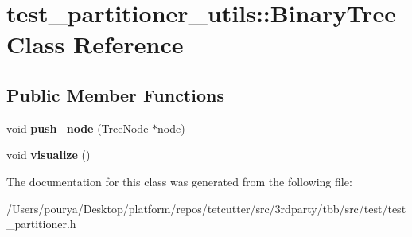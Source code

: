 \hypertarget{classtest__partitioner__utils_1_1BinaryTree}{}\section{test\+\_\+partitioner\+\_\+utils\+:\+:Binary\+Tree Class Reference}
\label{classtest__partitioner__utils_1_1BinaryTree}
\subsection*{Public Member Functions}
\begin{DoxyCompactItemize}
\item 
\hypertarget{classtest__partitioner__utils_1_1BinaryTree_a49bba99cfe47ceb1472b19a10b5d3e23}{}void {\bfseries push\+\_\+node} (\hyperlink{structtest__partitioner__utils_1_1TreeNode}{Tree\+Node} $\ast$node)\label{classtest__partitioner__utils_1_1BinaryTree_a49bba99cfe47ceb1472b19a10b5d3e23}

\item 
\hypertarget{classtest__partitioner__utils_1_1BinaryTree_a05fcce38d64bf46e892ac72c04b8fe53}{}void {\bfseries visualize} ()\label{classtest__partitioner__utils_1_1BinaryTree_a05fcce38d64bf46e892ac72c04b8fe53}

\end{DoxyCompactItemize}


The documentation for this class was generated from the following file\+:\begin{DoxyCompactItemize}
\item 
/\+Users/pourya/\+Desktop/platform/repos/tetcutter/src/3rdparty/tbb/src/test/test\+\_\+partitioner.\+h\end{DoxyCompactItemize}
